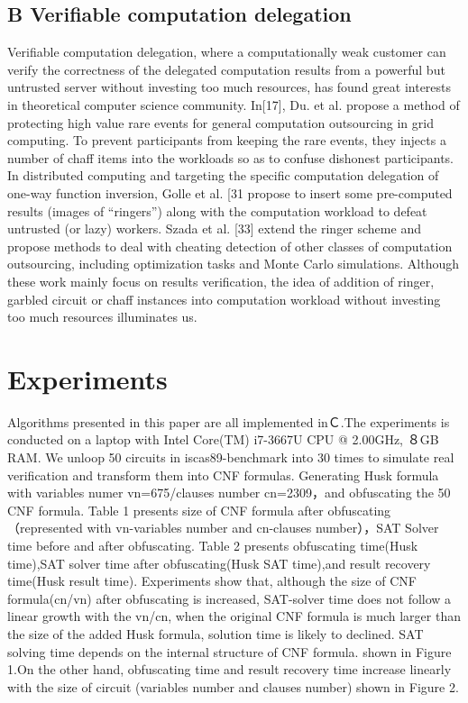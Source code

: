 \documentclass[runningheads,a4paper]{llncs}
\begin{document}
\subsection{B Verifiable computation delegation}
Verifiable computation delegation, where a computationally weak customer can verify the correctness of the delegated computation results from a powerful but untrusted server without investing too much resources, has found great interests in theoretical computer science community.
In[17], Du. et al. propose a method of protecting high value rare events for general computation outsourcing in grid computing. To prevent participants from keeping the rare events, they injects a number of chaff items into the workloads so as to confuse dishonest participants.
In distributed computing and targeting the specific computation delegation of one-way function inversion, Golle et al. [31 propose to insert some pre-computed results (images of “ringers”) along with the computation workload to defeat untrusted (or lazy) workers. 
Szada et al. [33] extend the ringer scheme and propose methods to deal with cheating detection of other classes of computation outsourcing, including optimization tasks and Monte Carlo simulations.
Although these work mainly focus on results verification, the idea of addition of ringer, garbled circuit or chaff instances into computation workload without investing too much resources illuminates us.

\section{Experiments} 
Algorithms presented in this paper are all implemented inＣ.The experiments is conducted on a laptop with Intel Core(TM) i7-3667U CPU @ 2.00GHz, ８GB RAM. We unloop 50 circuits in iscas89-benchmark into 30 times to simulate real verification and transform them into CNF formulas. Generating Husk formula with variables numer vn=675/clauses number cn=2309，and obfuscating the 50 CNF formula. Table 1 presents size of CNF formula after obfuscating（represented with vn-variables number and cn-clauses number），SAT Solver time before and after obfuscating. Table 2 presents obfuscating time(Husk time),SAT solver time after obfuscating(Husk SAT time),and result recovery time(Husk result time).
Experiments show that, although the size of CNF formula(cn/vn) after obfuscating is increased, SAT-solver time does not follow a linear growth with the vn/cn, when the original CNF formula is much larger than the size of the added Husk formula, solution time is likely to declined. SAT solving time depends on the internal structure of CNF formula. shown in Figure 1.On the other hand, obfuscating time and result recovery time increase linearly with the size of circuit (variables number and clauses number) shown in Figure 2.
\end{document}
